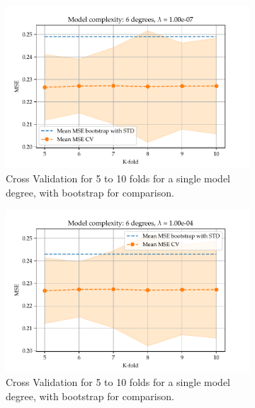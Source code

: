 \documentclass[11pt, a4paper]{article}
\begin{document}
\begin{figure}
  \centering
  \begin{subfigure}{0.49\textwidth}
      \centering
      \includegraphics[width=\textwidth]{figures/EX5_lasso_mse_cv_boot06.pdf}
      \caption{\label{fig:mse_cv_lasso_1}Cross Validation for 5 to 10 folds for a single model degree, with bootstrap for comparison.}
  \end{subfigure}
  \hfill
  \begin{subfigure}{0.49\textwidth}  
    \centering
    \includegraphics[width=\textwidth]{figures/EX5_lasso_mse_cv_boot16.pdf}
    \caption{\label{fig:mse_cv_lasso_2}Cross Validation for 5 to 10 folds for a single model degree, with bootstrap for comparison.}
  \end{subfigure}
  \hfill
  \begin{subfigure}{0.49\textwidth}  
    \centering

\end{subfigure}
\end{figure}
\end{document}

